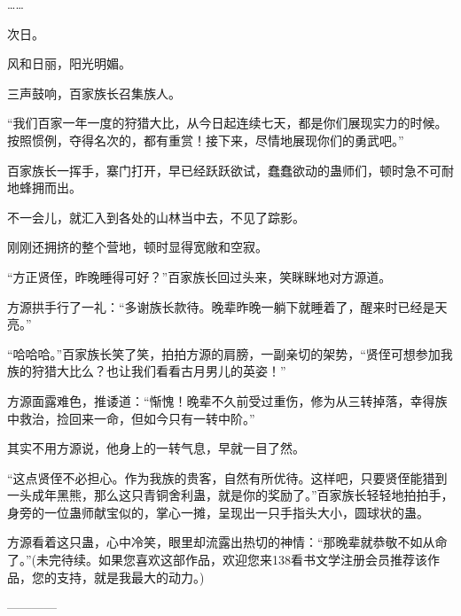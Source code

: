 \begin{this_body}
……

次日。

风和日丽，阳光明媚。

三声鼓响，百家族长召集族人。

“我们百家一年一度的狩猎大比，从今日起连续七天，都是你们展现实力的时候。按照惯例，夺得名次的，都有重赏！接下来，尽情地展现你们的勇武吧。”

百家族长一挥手，寨门打开，早已经跃跃欲试，蠢蠢欲动的蛊师们，顿时急不可耐地蜂拥而出。

不一会儿，就汇入到各处的山林当中去，不见了踪影。

刚刚还拥挤的整个营地，顿时显得宽敞和空寂。

“方正贤侄，昨晚睡得可好？”百家族长回过头来，笑眯眯地对方源道。

方源拱手行了一礼：“多谢族长款待。晚辈昨晚一躺下就睡着了，醒来时已经是天亮。”

“哈哈哈。”百家族长笑了笑，拍拍方源的肩膀，一副亲切的架势，“贤侄可想参加我族的狩猎大比么？也让我们看看古月男儿的英姿！”

方源面露难色，推诿道：“惭愧！晚辈不久前受过重伤，修为从三转掉落，幸得族中救治，捡回来一命，但如今只有一转中阶。”

其实不用方源说，他身上的一转气息，早就一目了然。

“这点贤侄不必担心。作为我族的贵客，自然有所优待。这样吧，只要贤侄能猎到一头成年黑熊，那么这只青铜舍利蛊，就是你的奖励了。”百家族长轻轻地拍拍手，身旁的一位蛊师献宝似的，掌心一摊，呈现出一只手指头大小，圆球状的蛊。

方源看着这只蛊，心中冷笑，眼里却流露出热切的神情：“那晚辈就恭敬不如从命了。”(未完待续。如果您喜欢这部作品，欢迎您来138看书文学注册会员推荐该作品，您的支持，就是我最大的动力。)

------------

\end{this_body}


